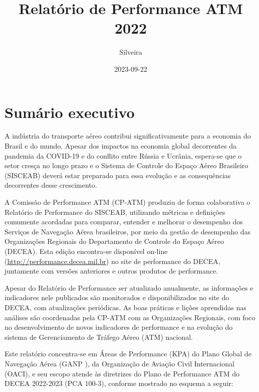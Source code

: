 \documentclass[
]{book}
\title{Relatório de Performance ATM 2022}
\author{Silveira}
\date{2023-09-22}
\begin{document}
\maketitle

{
\setcounter{tocdepth}{1}
\tableofcontents
}
\hypertarget{sumuxe1rio-executivo}{%
\chapter{Sumário executivo}\label{sumuxe1rio-executivo}}

A indústria do transporte aéreo contribui significativamente para a economia do Brasil e do mundo. Apesar dos impactos na economia global decorrentes da pandemia da COVID-19 e do conflito entre Rússia e Ucrânia, espera-se que o setor cresça no longo prazo e o Sistema de Controle do Espaço Aéreo Brasileiro (SISCEAB) deverá estar preparado para essa evolução e as consequências decorrentes desse crescimento.

A Comissão de Performance ATM (CP-ATM) produziu de forma colaborativa o Relatório de Performance do SISCEAB, utilizando métricas e definições comumente acordadas para comparar, entender e melhorar o desempenho dos Serviços de Navegação Aérea brasileiros, por meio da gestão de desempenho das Organizações Regionais do Departamento de Controle do Espaço Aéreo (DECEA). Esta edição encontra-se disponível on-line (\url{http://performance.decea.mil.br}) no site de performance do DECEA, juntamente com versões anteriores e outros produtos de performance.

Apesar do Relatório de Performance ser atualizado anualmente, as informações e indicadores nele publicados são monitorados e disponibilizados no site do DECEA, com atualizações periódicas. As boas práticas e lições aprendidas nas análises são coordenadas pela CP-ATM com as Organizações Regionais, com foco no desenvolvimento de novos indicadores de performance e na evolução do sistema de Gerenciamento de Tráfego Aéreo (ATM) nacional.

Este relatório concentra-se em Áreas de Performance (KPA) do Plano Global de Navegação Aérea (GANP ), da Organização de Aviação Civil Internacional (OACI), e seu escopo atende às diretrizes do Plano de Performance ATM do DECEA 2022-2023 (PCA 100-3), conforme mostrado no esquema a seguir:
\end{document}
